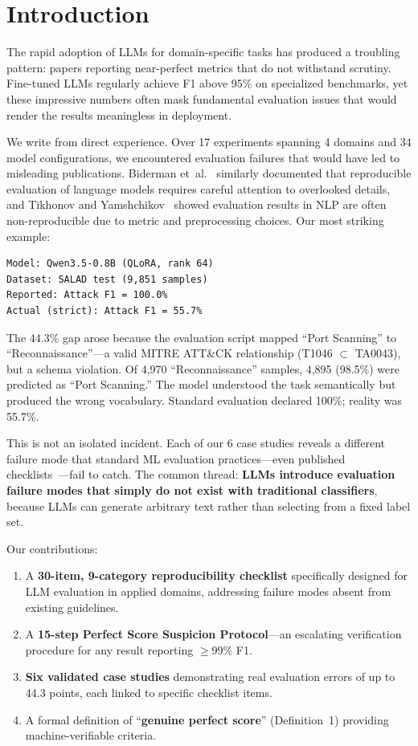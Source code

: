 \documentclass[review,3p]{elsarticle}
\begin{document}
\section{Introduction}

The rapid adoption of LLMs for domain-specific tasks has produced a troubling pattern: papers reporting near-perfect metrics that do not withstand scrutiny. Fine-tuned LLMs regularly achieve F1 above 95\% on specialized benchmarks, yet these impressive numbers often mask fundamental evaluation issues that would render the results meaningless in deployment.

We write from direct experience. Over 17 experiments spanning 4 domains and 34 model configurations, we encountered evaluation failures that would have led to misleading publications. Biderman et~al.~\cite{biderman2024} similarly documented that reproducible evaluation of language models requires careful attention to overlooked details, and Tikhonov and Yamshchikov~\cite{tikhonov2024} showed evaluation results in NLP are often non-reproducible due to metric and preprocessing choices. Our most striking example:

\begin{lstlisting}
Model: Qwen3.5-0.8B (QLoRA, rank 64)
Dataset: SALAD test (9,851 samples)
Reported: Attack F1 = 100.0%
Actual (strict): Attack F1 = 55.7%
\end{lstlisting}

The 44.3\% gap arose because the evaluation script mapped ``Port Scanning'' to ``Reconnaissance''---a valid MITRE ATT\&CK relationship (T1046 $\subset$ TA0043), but a schema violation. Of 4,970 ``Reconnaissance'' samples, 4,895 (98.5\%) were predicted as ``Port Scanning.'' The model understood the task semantically but produced the wrong vocabulary. Standard evaluation declared 100\%; reality was 55.7\%.

This is not an isolated incident. Each of our 6 case studies reveals a different failure mode that standard ML evaluation practices---even published checklists~\cite{pineau2021}---fail to catch. The common thread: \textbf{LLMs introduce evaluation failure modes that simply do not exist with traditional classifiers}, because LLMs can generate arbitrary text rather than selecting from a fixed label set.

Our contributions:
\begin{enumerate}
\item A \textbf{30-item, 9-category reproducibility checklist} specifically designed for LLM evaluation in applied domains, addressing failure modes absent from existing guidelines.
\item A \textbf{15-step Perfect Score Suspicion Protocol}---an escalating verification procedure for any result reporting $\geq$99\% F1.
\item \textbf{Six validated case studies} demonstrating real evaluation errors of up to 44.3 points, each linked to specific checklist items.
\item A formal definition of ``\textbf{genuine perfect score}'' (Definition~1) providing machine-verifiable criteria.
\end{enumerate}
\end{document}
